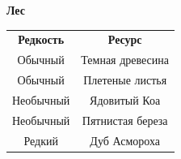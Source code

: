 \documentclass[a4paper, 9pt, twocolumn]{book}
\begin{document}
	\begin{table}[H]

		{\Large \textbf{Лес}}
		
		\centering
		
		\medspace 
		
		\begin{tabularx}{\linewidth}{C C}
			
			\textbf{Редкость} & \textbf{Ресурс} \\
			
			Обычный & Темная древесина \\
			
			Обычный & Плетеные листья \\
			
			Необычный & Ядовитый Коа \\
			
			Необычный & Пятнистая береза \\
			
			Редкий & Дуб Асмороха \\
			
		\end{tabularx}
	\end{table}
\end{document}
